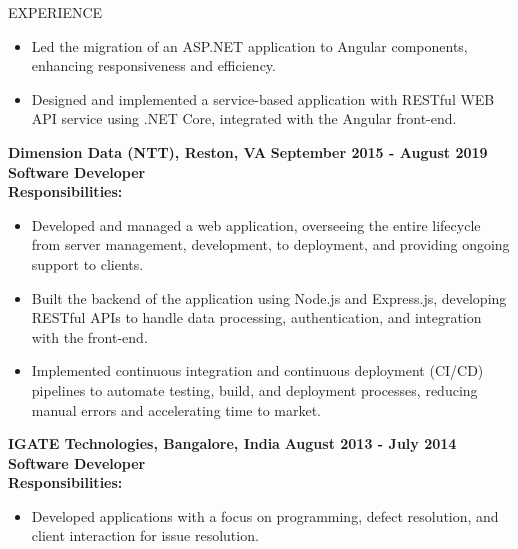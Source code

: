 \documentclass{resume} %
\begin{document}
\begin{rSection}{EXPERIENCE}
\begin{flushleft}
\begin{itemize}
                                    \item Led the migration of an ASP.NET application to Angular components, enhancing responsiveness and efficiency.
                                    \item Designed and implemented a service{-}based application with RESTful WEB API service using .NET Core, integrated with the Angular front{-}end.
                            \end{itemize}
            \vspace{0.5em}
            \textbf{Dimension Data (NTT), Reston, VA} \hfill \textbf{September 2015 {-} August 2019} \\
            \textbf{Software Developer} \\
            \vspace{1em}
            \textbf{Responsibilities:} \\
            \begin{itemize}
                                    \item Developed and managed a web application, overseeing the entire lifecycle from server management, development, to deployment, and providing ongoing support to clients.
                                    \item Built the backend of the application using Node.js and Express.js, developing RESTful APIs to handle data processing, authentication, and integration with the front{-}end.
                                    \item Implemented continuous integration and continuous deployment (CI/CD) pipelines to automate testing, build, and deployment processes, reducing manual errors and accelerating time to market.
                            \end{itemize}
            \vspace{0.5em}
            \textbf{IGATE Technologies, Bangalore, India} \hfill \textbf{August 2013 {-} July 2014} \\
            \textbf{Software Developer} \\
            \vspace{1em}
            \textbf{Responsibilities:} \\
            \begin{itemize}
                                    \item Developed applications with a focus on programming, defect resolution, and client interaction for issue resolution.

\end{itemize}
\end{flushleft}
\end{rSection}
\end{document}

